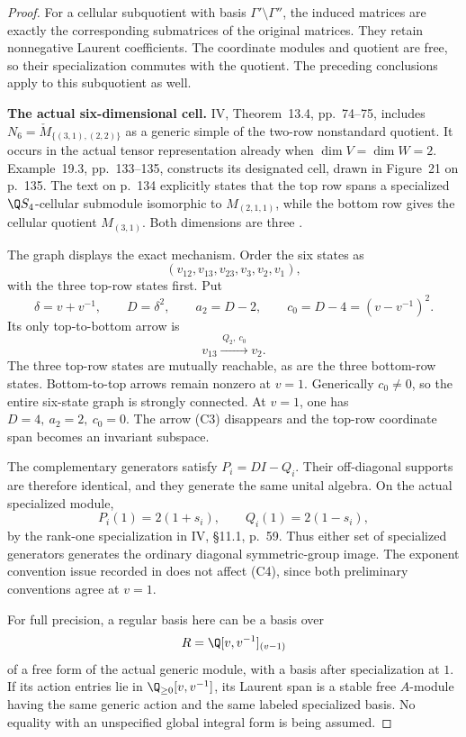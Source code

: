 \begin{proof}
For a cellular subquotient with basis
\(\Gamma'\setminus\Gamma''\), the induced matrices are exactly
the corresponding submatrices of the original matrices.
They retain nonnegative Laurent coefficients.
The coordinate modules and quotient are free, so their
specialization commutes with the quotient.
The preceding conclusions apply to this subquotient as well.

\par\smallskip\noindent\textbf{The actual six-dimensional cell.}\quad
IV, Theorem~13.4, pp.~74--75, includes
\(N_6=\check M_{\{(3,1),(2,2)\}}\) as a generic simple of the
two-row nonstandard quotient.
It occurs in the actual tensor representation already when
\(\dim V=\dim W=2\).
Example~19.3, pp.~133--135, constructs its designated cell,
drawn in Figure~21 on p.~135.
The text on p.~134 explicitly states that the top row spans
a specialized \(\Q S_4\)-cellular submodule isomorphic to
\(M_{(2,1,1)}\), while the bottom row gives the cellular
quotient \(M_{(3,1)}\).
Both dimensions are three \cite{IV}.

The graph displays the exact mechanism.
Order the six states as
\[
(v_{12},v_{13},v_{23},v_3,v_2,v_1),
\]
with the three top-row states first.
Put
\[
\delta=v+v^{-1},\qquad D=\delta^2,\qquad
a_2=D-2,\qquad c_0=D-4=(v-v^{-1})^2.
\]
Its only top-to-bottom arrow is
\[
v_{13}\xrightarrow{\,Q_2,\ c_0\,}v_2.
\tag{C3}
\]
The three top-row states are mutually reachable, as are
the three bottom-row states.
Bottom-to-top arrows remain nonzero at \(v=1\).
Generically \(c_0\ne0\), so the entire six-state graph is
strongly connected.
At \(v=1\), one has \(D=4,\ a_2=2,\ c_0=0\).
The arrow (C3) disappears and the top-row coordinate span
becomes an invariant subspace.

The complementary generators satisfy \(P_i=DI-Q_i\).
Their off-diagonal supports are therefore identical,
and they generate the same unital algebra.
On the actual specialized module,
\[
P_i(1)=2(1+s_i),\qquad Q_i(1)=2(1-s_i),
\tag{C4}
\]
by the rank-one specialization in IV, \S11.1, p.~59.
Thus either set of specialized generators generates the
ordinary diagonal symmetric-group image.
The exponent convention issue recorded in  does
not affect (C4), since both preliminary conventions agree
at \(v=1\).

For full precision, a regular basis here can be a basis over
\[
R=\Q[v,v^{-1}]_{(v-1)}
\]
of a free form of the actual generic module, with a basis
after specialization at \(1\).
If its action entries lie in \(\Q_{\ge0}[v,v^{-1}]\),
its Laurent span is a stable free \(A\)-module having the
same generic action and the same labeled specialized basis.
No equality with an unspecified global integral form is
being assumed.


\end{proof}
